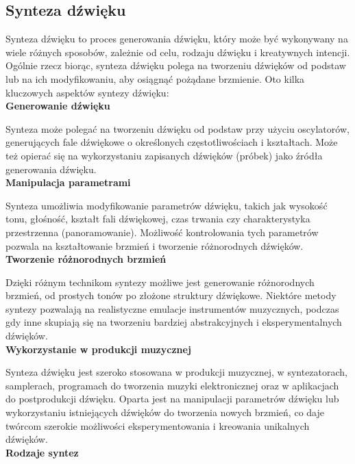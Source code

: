 \subsection{Synteza dźwięku}

Synteza dźwięku \cite{sound_synthesis} to proces generowania dźwięku, który może być wykonywany na wiele różnych sposobów, zależnie od celu, rodzaju dźwięku i kreatywnych intencji. Ogólnie rzecz biorąc, synteza dźwięku polega na tworzeniu dźwięków od podstaw lub na ich modyfikowaniu, aby osiągnąć pożądane brzmienie. Oto kilka kluczowych aspektów syntezy dźwięku:\\

\noindent\textbf{Generowanie dźwięku}

Synteza może polegać na tworzeniu dźwięku od podstaw przy użyciu oscylatorów, generujących fale dźwiękowe o określonych częstotliwościach i kształtach. Może też opierać się na wykorzystaniu zapisanych dźwięków (próbek) jako źródła generowania dźwięku.\\

\noindent\textbf{Manipulacja parametrami}

Synteza umożliwia modyfikowanie parametrów dźwięku, takich jak wysokość tonu, głośność, kształt fali dźwiękowej, czas trwania czy charakterystyka przestrzenna (panoramowanie). Możliwość kontrolowania tych parametrów pozwala na kształtowanie brzmień i tworzenie różnorodnych dźwięków.\\

\noindent\textbf{Tworzenie różnorodnych brzmień}

Dzięki różnym technikom syntezy możliwe jest generowanie różnorodnych brzmień, od prostych tonów po złożone struktury dźwiękowe. Niektóre metody syntezy pozwalają na realistyczne emulacje instrumentów muzycznych, podczas gdy inne skupiają się na tworzeniu bardziej abstrakcyjnych i eksperymentalnych dźwięków.\\

\noindent\textbf{Wykorzystanie w produkcji muzycznej}

Synteza dźwięku jest szeroko stosowana w produkcji muzycznej, w syntezatorach, samplerach, programach do tworzenia muzyki elektronicznej oraz w aplikacjach do postprodukcji dźwięku. Oparta jest na manipulacji parametrów dźwięku lub wykorzystaniu istniejących dźwięków do tworzenia nowych brzmień, co daje twórcom szerokie możliwości eksperymentowania i kreowania unikalnych dźwięków.\\

\noindent\textbf{Rodzaje syntez}


